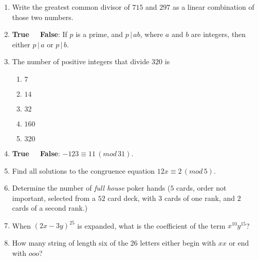\begin{enumerate}
\medskip

\item Write the greatest common divisor of $715$ and $297$ as a linear combination 
of those two numbers.

 

\item {\bf True \ \  False}: If $p$ is a prime, and $p\,|\,ab$, where $a$ and $b$ are integers, 
then either $p\,|\,a$ or $p\,|\,b$.

\medskip

\item The number of positive integers that divide $320$ is
\begin{enumerate}

\item $7$\\[4pt]

\item $14$\\[4pt]

\item $32$\\[4pt]

\item $160$\\[4pt]

\item $320$\\

\end{enumerate}

\medskip

\item {\bf True \ \  False}: $-123\equiv 11 \,(mod\,31)$.

\medskip

\item  Find all solutions to the congruence equation $12x\equiv 2 \,(mod\,5)$.

\medskip

\item Determine the number of {\it full house} poker hands ($5$ cards, order not important, selected
from a $52$ card deck, with $3$ cards of one rank, and $2$ cards of a second rank.)

\medskip

\item When $(2x-3y)^{25}$ is expanded, what is the coefficient of the term $x^{10}y^{15}$?

\medskip

\item How many string of length six of the $26$ letters either begin with $xx$ or end with $ooo$?


\end{enumerate}
